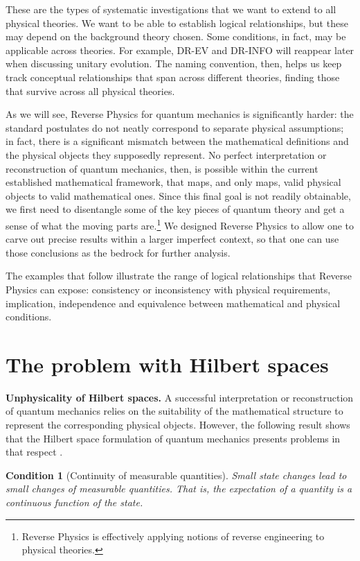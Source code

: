 \documentclass[entropy,article,submit,moreauthors]{Definitions/mdpi}
\newtheorem{condth}{Condition}
\renewcommand*{\thecondth}{\Roman{condth}}
\newenvironment{condition}[2][]{\renewcommand{\thecondth}{#2}\begin{condth}[#1]\label{#2}}{\end{condth}\renewcommand{\thecondth}{\Roman{condth}}}
\begin{document}
These are the types of systematic investigations that we want to extend to all physical theories. We want to be able to establish logical relationships, but these may depend on the background theory chosen. Some conditions, in fact, may be applicable across theories. For example, DR-EV and DR-INFO will reappear later when discussing unitary evolution. The naming convention, then, helps us keep track conceptual relationships that span across different theories, finding those that survive across all physical theories.

As we will see, Reverse Physics for quantum mechanics is significantly harder: the standard postulates do not neatly correspond to separate physical assumptions; in fact, there is a significant mismatch between the mathematical definitions and the physical objects they supposedly represent. No perfect interpretation or reconstruction of quantum mechanics, then, is possible within the current established mathematical framework, that maps, and only maps, valid physical objects to valid mathematical ones. Since this final goal is not readily obtainable, we first need to disentangle some of the key pieces of quantum theory and get a sense of what the moving parts are.\footnote{Reverse Physics is effectively applying notions of reverse engineering to physical theories.} We designed Reverse Physics to allow one to carve out precise results within a larger imperfect context, so that one can use those conclusions as the bedrock for further analysis.

The examples that follow illustrate the range of logical relationships that Reverse Physics can expose: consistency or inconsistency with physical requirements, implication, independence and equivalence between mathematical and physical conditions.

\section{The problem with Hilbert spaces}

\textbf{Unphysicality of Hilbert spaces.} A successful interpretation or reconstruction of quantum mechanics relies on the suitability of the mathematical structure to represent the corresponding physical objects. However, the following result shows that the Hilbert space formulation of quantum mechanics presents problems in that respect \cite{CarcassiCalderonAidala2025}.

\begin{condition}[Continuity of measurable quantities]{[B]COBS}
 	Small state changes lead to small changes of measurable quantities. That is, the expectation of a quantity is a continuous function of the state.
\end{condition}
 
\end{document}
